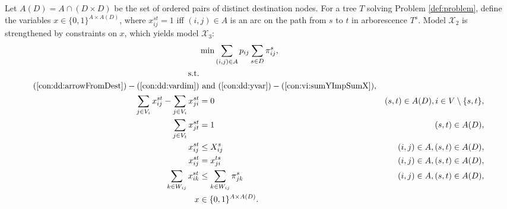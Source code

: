 Let $A(D)=A\cap(D\times D)$ be the set of ordered pairs of distinct destination nodes.
For a tree $T$ solving Problem \ref{def:problem}, define the variables $x\in\{0,1\}^{A\times A(D)}$, where
$x_{ij}^{st}=1$ iff $(i,j) \in A$ is an arc on the path from $s$ to $t$ in arborescence $T^s$.
Model $\mathcal{X}_2$ is strengthened by constraints on $x$, which yields model $\mathcal{X}_3$: 
\newline
\newline
\begin{subequations}[resume]\label{eq:smt-x3}
\begin{align}
\notag\makebox[0pt][l]{$\displaystyle{} \min \sum\limits_{(i,j) \in A} p_{ij} \sum\limits_{s \in D} \pi^s_{ij}, $}\\
\text{s.t.} \notag \\
(\ref{con:dd:arrowFromDest}) - (\ref{con:dd:vardim}) &\text{ and }(\ref{con:dd:yvar}) - (\ref{con:vi:sumYImpSumX}), \notag\\
\label{con:mf:flowNormal} \sum\limits_{\substack{ j\in V_i}}x^{st}_{ij}-\sum\limits_{\substack{j\in V_i }}x^{st}_{ji} & = 0 & (s,t)\in A(D), i\in V\setminus\{s,t\},\\
\label{con:mf:flowDest} \sum\limits_{\substack{j\in V_t}}x^{st}_{jt}    & = 1  & (s,t)\in A(D),\\
\label{con:mf:fcap} x^{st}_{ij} &\leq X^{s}_{ij}& (i,j)\in A, (s,t)\in A(D),\\
\label{con:mf:fsym} x^{st}_{ij} &=  x^{ts}_{ji}& (i,j)\in A, (s,t)\in A(D),\\ 
\label{con:vi:sumFImpSumY} \sum_{k\in W_{ij}}x^{st}_{ik} & \leq \sum_{k\in W_{ij}} \pi^{s}_{jk} & (i,j)\in A, (s,t)\in A(D),\\
\label{con:mf:xydim} x&\in\{0,1\}^{A\times A(D)}. 
\end{align}~
\end{subequations}

